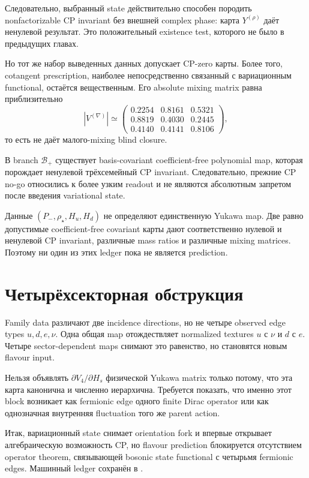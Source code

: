Следовательно, выбранный state действительно способен породить
nonfactorizable CP invariant без внешней complex phase: карта
\(Y^{(\rho)}\) даёт ненулевой результат. Это положительный existence test,
которого не было в предыдущих главах.

Но тот же набор выведенных данных допускает CP-zero карты. Более того,
cotangent prescription, наиболее непосредственно связанный с вариационным
functional, остаётся вещественным. Его absolute mixing matrix равна
приблизительно
\begin{equation}
 |V^{(\nabla)}|\simeq
 \begin{pmatrix}
 0.2254&0.8161&0.5321\\
 0.8819&0.4030&0.2445\\
 0.4140&0.4141&0.8106
 \end{pmatrix},
\end{equation}
то есть не даёт малого-mixing blind closure.

\begin{theorem}
В branch \(\mathcal B_+\) существует basis-covariant coefficient-free
polynomial map, которая порождает ненулевой трёхсемейный CP invariant.
Следовательно, прежние CP no-go относились к более узким readout и не
являются абсолютным запретом после введения variational state.
\end{theorem}

\begin{theorem}
Данные \((P_-,\rho_\star,H_u,H_d)\) не определяют единственную Yukawa map.
Две равно допустимые coefficient-free covariant карты дают соответственно
нулевой и ненулевой CP invariant, различные mass ratios и различные mixing
matrices. Поэтому ни один из этих ledger пока не является prediction.
\end{theorem}

\section{Четырёхсекторная обструкция}

Family data различают две incidence directions, но не четыре observed edge
types \(u,d,e,\nu\). Одна общая map отождествляет normalized textures
\(u\) с \(\nu\) и \(d\) с \(e\). Четыре sector-dependent maps снимают это
равенство, но становятся новым flavour input.

\begin{nogocriterion}
Нельзя объявлять \(\partial V_4/\partial H_s\) физической Yukawa matrix только
потому, что эта карта канонична и численно иерархична. Требуется показать,
что именно этот block возникает как fermionic edge одного finite Dirac
operator или как однозначная внутренняя fluctuation того же parent action.
\end{nogocriterion}

Итак, вариационный state снимает orientation fork и впервые открывает
алгебраическую возможность CP, но flavour prediction блокируется отсутствием
operator theorem, связывающей bosonic state functional с четырьмя fermionic
edges. Машинный ledger сохранён в
.